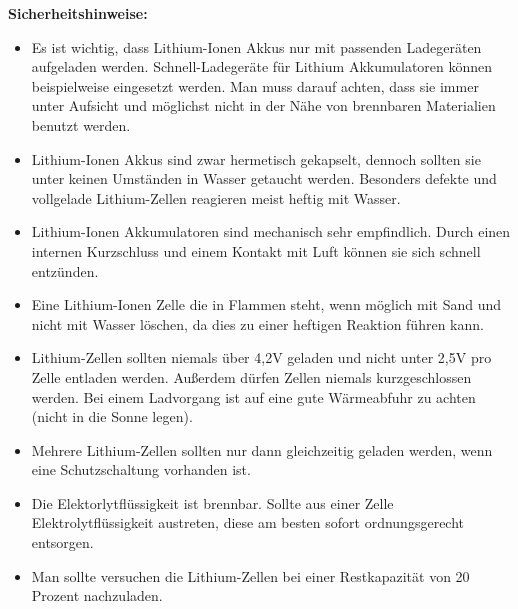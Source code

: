 \textbf{Sicherheitshinweise:}

\begin{itemize}
	\item{Es ist wichtig, dass Lithium-Ionen Akkus nur mit passenden Ladegeräten aufgeladen werden. Schnell-Ladegeräte für Lithium Akkumulatoren können beispielweise eingesetzt werden. Man muss darauf achten, dass sie immer unter Aufsicht und möglichst nicht in der Nähe von brennbaren Materialien benutzt werden.} \medskip\\

	\item {Lithium-Ionen Akkus sind zwar hermetisch gekapselt, dennoch sollten sie unter keinen Umständen in Wasser getaucht werden. Besonders defekte und  vollgelade Lithium-Zellen reagieren meist heftig mit Wasser.}\medskip\\
	
	\item {Lithium-Ionen Akkumulatoren sind mechanisch sehr empfindlich. Durch einen internen Kurzschluss und einem Kontakt mit Luft können sie sich schnell entzünden.}\medskip\\
	
	\item {Eine Lithium-Ionen Zelle die in Flammen steht, wenn möglich mit Sand und nicht mit Wasser löschen, da dies zu einer heftigen Reaktion führen kann.}\medskip\\
	
	\item {Lithium-Zellen sollten niemals über 4,2V geladen und nicht unter 2,5V pro Zelle entladen werden. Außerdem dürfen Zellen niemals kurzgeschlossen werden. Bei einem Ladvorgang ist auf eine gute Wärmeabfuhr zu achten (nicht in die Sonne legen).}\medskip\\
	
	\item {Mehrere Lithium-Zellen sollten nur dann gleichzeitig geladen werden, wenn eine Schutzschaltung vorhanden ist.}\medskip\\
	
	\item {Die Elektorlytflüssigkeit ist brennbar. Sollte aus einer Zelle Elektrolytflüssigkeit austreten, diese am besten sofort ordnungsgerecht entsorgen.}\medskip\\
	
	\item {Man sollte versuchen die Lithium-Zellen bei einer Restkapazität von 20 Prozent nachzuladen.}\medskip\\

\end{itemize}
\newpage

